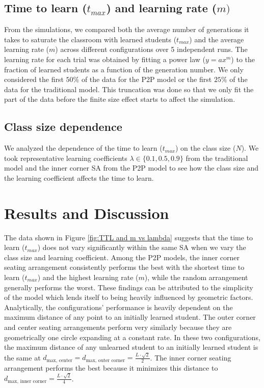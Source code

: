 \documentclass[10pt,a4paper,twoside]{article}
\begin{document}
\subsection{Time to learn ($t_{max}$) and learning rate ($m)$}
From the simulations, we compared both the average number of generations it takes to saturate the classroom with learned students ($t_{max}$) and the average learning rate ($m$) across different configurations over 5 independent runs. The learning rate for each trial was obtained by fitting a power law ($y = ax^m$) to the fraction of learned students as a function of the generation number. We only considered the first $50\%$ of the data for the P2P model or the first $25\%$ of the data for the traditional model. This truncation was done so that we only fit the part of the data before the finite size effect starts to affect the simulation. %

\subsection{Class size dependence}
We analyzed the dependence of the time to learn ($t_{max}$) on the class size ($N$). We took representative learning coefficients $\lambda \in \lbrace 0.1, 0.5, 0.9 \rbrace$ from the traditional model and the inner corner SA from the P2P model to see how the class size and the learning coefficient affects the time to learn. %

\section{Results and Discussion}
The data shown in Figure \ref{fig:TTL and m vs lambda} suggests that the time to learn ($t_{max}$) does not vary significantly within the same SA when we vary the class size and learning coefficient. Among the P2P models, the inner corner seating arrangement consistently performs the best with the shortest time to learn ($t_{max}$) and the highest learning rate ($m$), while the random arrangement generally performs the worst. These findings can be attributed to the simplicity of the model which lends itself to being heavily influenced by geometric factors. Analytically, the configurations’ performance is heavily dependent on the maximum distance of any point to an initially learned student. The outer corner and center seating arrangements perform very similarly because they are geometrically one circle expanding at a constant rate. In these two configurations, the maximum distance of any unlearned student to an initially learned student is the same at $d_{\text{max, center}} = d_{\text{max, outer corner}}=\frac{L\cdot\sqrt{2}}{2}$. The inner corner seating arrangement performs the best because it minimizes this distance to $d_{\text{max, inner corner}}=\frac{L\cdot\sqrt{2}}{4}$.
\end{document}
